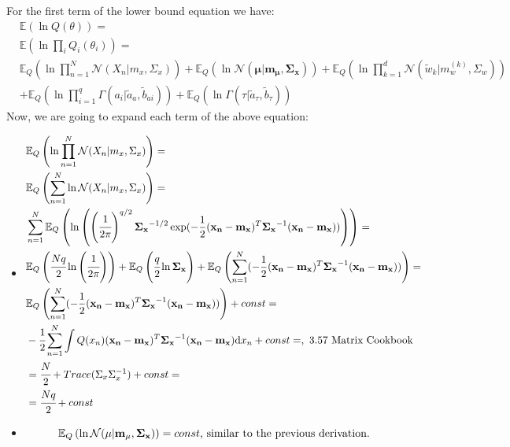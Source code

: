 \documentclass[11pt,notitlepage]{article}
\begin{document}
For the first term of the lower bound equation we have:
\begin{align*}
& \mathbb{E}(\ln Q(\theta)) =\\
& \mathbb{E}(\ln \prod_i Q_i(\theta_i)) =\\
& \mathbb{E}_Q \left( \ln \prod_{n=1}^N \mathcal{N}(X_n|m_x,\Sigma_x)\right) + \mathbb{E}_Q \left( \ln \mathcal{N}(\mathbf{\mu}|\mathbf{m_{\mu}, \mathbf{\Sigma}_x})\right) + \mathbb{E}_Q \left( \ln \prod_{k=1}^d \mathcal{N} (\tilde{w}_k|m_w^{(k)},\Sigma_w)\right)\\
&+ \mathbb{E}_Q \left( \ln \prod_{i=1}^q \Gamma (a_i | \tilde{a}_a, \tilde{b}_{ai})\right) + \mathbb{E}_Q \left( \ln \Gamma (\tau | \tilde{a}_{\tau}, \tilde{b}_{\tau})\right)
\end{align*}
Now, we are going to expand each term of the above equation:
\begin{itemize}
\item 
\begin{align*}
&\mathbb{E}_Q \left( \ln \prod_{n=1}^N \mathcal{N}(X_n|m_x,\Sigma_x)\right) = \\
&\mathbb{E}_Q \left(\sum_{n=1}^N \ln \mathcal{N}(X_n|m_x,\Sigma_x) \right)=\\
&\sum_{n=1}^N \mathbb{E}_Q \left( \ln \left( \left( \cfrac{1}{2\pi}\right)^{q/2} \mathbf{\Sigma_x}^{-1/2} \exp (-\frac{1}{2}(\mathbf{x_n} - \mathbf{m_x})^T \mathbf{\Sigma_x}^{-1}(\mathbf{x_n} - \mathbf{m_x}) )\right) \right)=\\
&\mathbb{E}_Q\left( \cfrac{Nq}{2}\ln \left( \cfrac{1}{2\pi} \right) \right) + \mathbb{E}_Q\left( \cfrac{q}{2} \ln \mathbf{\Sigma_x}  \right) + \mathbb{E}_Q\left( \sum_{n=1}^N (-\frac{1}{2}(\mathbf{x_n} - \mathbf{m_x})^T \mathbf{\Sigma_x}^{-1}(\mathbf{x_n} - \mathbf{m_x})) \right) = \\
&\mathbb{E}_Q\left( \sum_{n=1}^N (-\frac{1}{2}(\mathbf{x_n} - \mathbf{m_x})^T \mathbf{\Sigma_x}^{-1}(\mathbf{x_n} - \mathbf{m_x})) \right) + const = \\
&-\cfrac{1}{2} \sum_{n=1}^N \int Q(x_n) (\mathbf{x_n} - \mathbf{m_x})^T \mathbf{\Sigma_x}^{-1}(\mathbf{x_n} - \mathbf{m_x})\mathrm{d}x_n + const =,\text{ 3.57 Matrix Cookbook}\\
&= \cfrac{N}{2} + Trace(\Sigma_x \Sigma_x^{-1}) + const = \\
&= \cfrac{Nq}{2} +const
\end{align*}
\item 
\begin{equation*}
\mathbb{E}_Q \left( \ln \mathcal{N}(\mathbf{\mu}|\mathbf{m_{\mu}, \mathbf{\Sigma}_x})\right) =  const\text{, similar to the previous derivation.} \\

\end{equation*}
\end{itemize}
\end{document}

